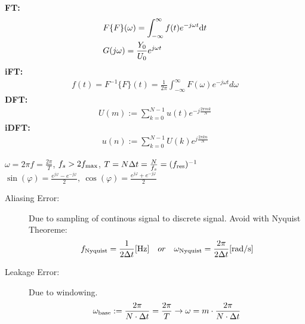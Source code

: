 \begin{tcolorbox}[colback=brown!5!white,colframe=brown!75!black,title=\textbf{Fourier Transformation}]
	\textbf{FT:}\begin{align*}
				  &F\{F\}(\omega) = \int_{-\infty}^{\infty} f(t) e^{-j\omega t}\mathrm{d} t\\
				  &G(j\omega)=\frac{Y_0}{U_0}e^{j\omega t}
	\end{align*}
	\textbf{iFT:}\begin{align*}
	f(t) = F^{-1}\{F\}(t) = \frac{1}{2\pi}\int_{-\infty}^{\infty} F(\omega) e^{-j\omega t}d\omega
	\end{align*}
	\textbf{DFT:}\begin{align*}
	U(m) := \sum_{k = 0}^{N-1} u(t)e^{-j\frac{2\pi m k}{N}}
	\end{align*}
	\textbf{iDFT:}\begin{align*}
	u(n) := \sum_{k = 0}^{N-1} U(k)e^{j\frac{2\pi k n}{N}}
				  \end{align*}
\end{tcolorbox}

\begin{tcolorbox}[colback=brown!5!white,colframe=brown!75!black,title=\textbf{Useful frequency things}]
  $\omega = 2\pi f = \frac{2\pi}{T}$, \quad $f_s > 2 f_\mathrm{max}$, \quad $T = N \Delta{t} = \frac{N}{f_s} = (f_\mathrm{res})^{-1} $\quad\\
  $\sin(\varphi)=\frac{e^{j\varphi}-e^{-j\varphi}}{2},\ \cos(\varphi)=\frac{e^{j\varphi}+e^{-j\varphi}}{2}$
\end{tcolorbox}

\begin{tcolorbox}[colback=brown!5!white,colframe=brown!75!black,title=\textbf{Aliasing and Leakage Errors}]
\begin{description}
	\item[Aliasing Error:] Due to sampling of continous signal to discrete signal. Avoid with Nyquist Theoreme:
	\begin{equation*}
	f_\mathrm{Nyquist} = \frac{1}{2\Delta t} [\SI{}{\hertz}] \quad or \quad \omega_\mathrm{Nyquist} = \frac{2\pi}{2\Delta t} [\SI{}{\radian \per \second}]
	\end{equation*}
	
	\item[Leakage Error:] Due to windowing.
	\begin{equation*}
	\omega_\mathrm{base} := \frac{2\pi}{N \cdot \Delta t} = \frac{2\pi}{T} \rightarrow \omega = m\cdot \frac{2\pi }{N \cdot \Delta t}
	\end{equation*}
\end{description}
\end{tcolorbox}

